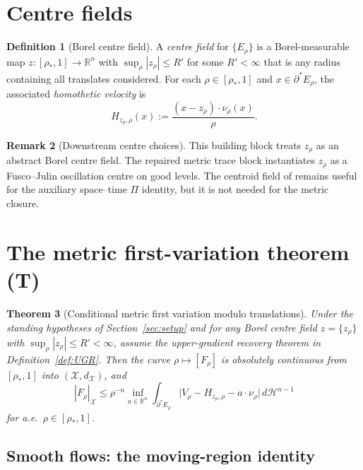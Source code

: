 \documentclass[11pt]{article}
\newtheorem{theorem}{Theorem}[section]
\theoremstyle{definition}
\newtheorem{definition}[theorem]{Definition}
\newtheorem{remark}[theorem]{Remark}
\newcommand{\R}{\mathbb{R}}
\newcommand{\rstar}{\rho_{*}}
\newcommand{\X}{\mathcal X}
\begin{document}
\section{Centre fields}\label{sec:center}

\begin{definition}[Borel centre field]\label{def:center}
A \emph{centre field} for $\{E_\rho\}$ is a Borel-measurable map
$z:[\rstar,1]\to\R^n$ with $\sup_\rho|z_\rho|\le R'$ for some
$R'<\infty$ that is any radius containing all translates considered.
For each $\rho\in[\rstar,1]$ and $x\in\partial^*E_\rho$,
the associated \emph{homothetic velocity} is
\begin{equation}\label{eq:H-def}
   H_{z_\rho,\rho}(x):=\frac{(x-z_\rho)\cdot\nu_\rho(x)}{\rho}.
\end{equation}
\end{definition}

\begin{remark}[Downstream centre choices]
\label{rem:centroid}
This building block treats $z_\rho$ as an abstract Borel centre field.
The repaired metric trace block instantiates $z_\rho$ as a Fusco--Julin
oscillation centre on good levels.  The centroid field of
\cite{CentroidBound} remains useful for the auxiliary space--time $\Pi$
identity, but it is not needed for the metric closure.
\end{remark}

\section{The metric first-variation theorem (T)}\label{sec:T}

\begin{theorem}[Conditional metric first variation modulo translations]\label{thm:T}
Under the standing hypotheses of Section~\ref{sec:setup} and for any Borel
centre field $z=\{z_\rho\}$ with $\sup_\rho|z_\rho|\le R'<\infty$, assume the
upper-gradient recovery theorem in Definition~\ref{def:UGR}.  Then the curve
$\rho\mapsto[F_\rho]$ is absolutely continuous from $[\rstar,1]$ into
$(\X,d_\X)$, and
\begin{equation}\label{eq:T}
   |\dot F_\rho|_\X
   \le \rho^{-n}\inf_{a\in\R^n}
       \int_{\partial^*E_\rho}\bigl|V_\rho-H_{z_\rho,\rho}-a\cdot\nu_\rho\bigr|
       \,d\mathcal H^{n-1}
\end{equation}
for a.e.\ $\rho\in[\rstar,1]$.
\end{theorem}

\subsection{Smooth flows: the moving-region identity}\label{ss:T-smooth}
\end{document}
